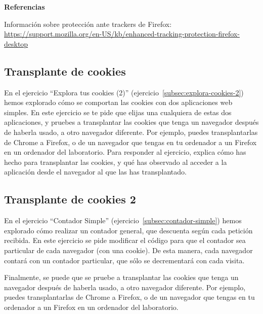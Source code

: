 \textbf{Referencias}

Información sobre protección ante trackers de Firefox: \\
\url{https://support.mozilla.org/en-US/kb/enhanced-tracking-protection-firefox-desktop}

\subsection{Transplante de cookies}
\label{subsec:transplante-cookies}

En el ejercicio ``Explora tus cookies (2)'' (ejercicio~\ref{subsec:explora-cookies-2}) hemos explorado cómo se comportan las cookies con dos aplicaciones web simples. En este ejercicio se te pide que elijas una cualquiera de estas dos aplicaciones, y pruebes a transplantar las cookies que tenga un navegador después de haberla usado, a otro navegador diferente. Por ejemplo, puedes transplantarlas de Chrome a Firefox, o de un navegador que tengas en tu ordenador a un Firefox en un ordenador del laboratorio. Para responder al ejercicio, explica cómo has hecho para transplantar las cookies, y qué has observado al acceder a la aplicación desde el navegador al que las has transplantado.

\subsection{Transplante de cookies 2}
\label{subsec:transplante-cookies2}

En el ejercicio ``Contador Simple'' (ejercicio~\ref{subsec:contador-simple}) hemos explorado cómo realizar un contador general, que descuenta según cada petición recibida. En este ejercicio se pide modificar el código para que el contador sea particular de cada navegador (con una cookie). De esta manera, cada navegador contará con un contador particular, que sólo se decrementará con cada visita.

Finalmente, se puede que se pruebe a transplantar las cookies que tenga un navegador después de haberla usado, a otro navegador diferente. Por ejemplo, puedes transplantarlas de Chrome a Firefox, o de un navegador que tengas en tu ordenador a un Firefox en un ordenador del laboratorio.


